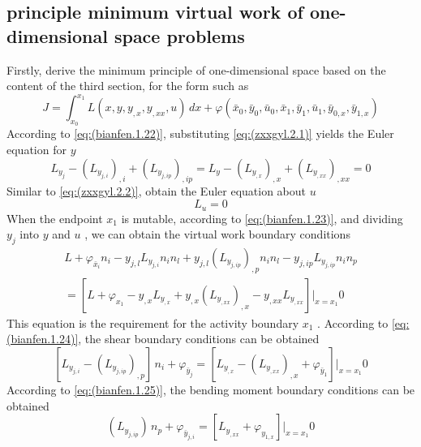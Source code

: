 \subsection {principle minimum virtual work of one-dimensional space problems}
Firstly, derive the minimum principle of one-dimensional space based on the content of the third section, for the form such as
\begin{equation}\label{eq:(zxxgyl.2.1)}
J = \int_{x_{0}}^{x_{1}} L(x,y,y_{,x},y_{,xx},u)\,dx+\varphi(\bar {x}_ {0},\bar {y}_ {0},\bar {u}_ {0},\bar {x}_ {1},\bar {y}_ {1},\bar {u}_ {1},\bar {y}_ {0,x},\bar {y}_ {1,x})
\end{equation}
According to \ref{eq:(bianfen.1.22)}, substituting \ref{eq:(zxxgyl.2.1)} yields the Euler equation for $ y$  
\begin{equation} \label{eq:(zxxgyl.2.2)}    
L_{y_j} - \left(L_{y_{j,i}}\right)_{,i}+\left(L_{y_{j,ip}}\right)_{,ip} =L_{y} - 
\left(L_{y_{,x}}\right)_{,x}+\left(L_{y_{,xx}}\right)_{,xx}=0
\end{equation}
Similar to \ref{eq:(zxxgyl.2.2)}, obtain the Euler equation about $ u $ 
\begin{equation} \label{eq:(zxxgyl.2.3)}    
L_{u}=0
\end{equation}
When the endpoint $ x_ {1}$  is mutable, according to \ref{eq:(bianfen.1.23)}, and dividing $ y_j $ into $ y$  and $ u $ , we can obtain the virtual work boundary conditions
\begin{multline} \label{eq:(zxxgyl.2.4)}    
L+ \varphi_{\bar {x}_i } n_i 
-y_{j,l} L_{y_{j,i}} n_i n_l   + y_{j,l} \left(L_{y_{j,ip}}\right)_{,p} n_i n_l 
-y_{j,ip} L_{y_{j,ip}} n_i  n_p 
\\=[L+ \varphi_{x_{1}}
-y_{,x} L_{y_{,x}}   + y_{,x} \left(L_{y_{,xx}}\right)_{,x} 
-y_{,xx} L_{y_{,xx}} 
]|_{x=x_1}  
0
\end{multline}
This equation is the requirement for the activity boundary $ x_ {1}$  .
According to \ref{eq:(bianfen.1.24)}, the shear boundary conditions can be obtained
\begin{equation} \label{eq:(zxxgyl.2.5)}    
[L_{y_{j,i}}   -\left(L_{y_{j,ip}}\right)_{,p}]\,n_i + \varphi_{\bar {y}_j } 
=[L_{y_{,x}}  -\left(L_{y_{,xx}}\right)_{,x} + \varphi_{\bar {y}_ {1} }]|_{x=x_1}  
0
\end{equation}
According to \ref{eq:(bianfen.1.25)}, the bending moment boundary conditions can be obtained
\begin{equation} \label{eq:(zxxgyl.2.6)}    
\left(L_{y_{j,ip}}  \right)\,n_p +\varphi_{\bar {y}_ {j,i}} 
=[L_{y_{,xx}}  +\varphi_{y_{1,x}}]|_{x=x_1}   
0
\end{equation}
